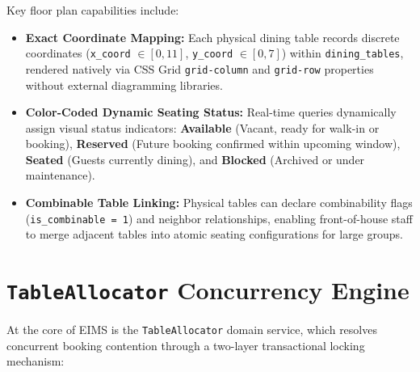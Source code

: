 Key floor plan capabilities include:
\begin{itemize}
    \item \textbf{Exact Coordinate Mapping:} Each physical dining table records discrete coordinates (\texttt{x\_coord} $\in [0, 11]$, \texttt{y\_coord} $\in [0, 7]$) within \texttt{dining\_tables}, rendered natively via CSS Grid \texttt{grid-column} and \texttt{grid-row} properties without external diagramming libraries.
    \item \textbf{Color-Coded Dynamic Seating Status:} Real-time queries dynamically assign visual status indicators: \textbf{Available} (Vacant, ready for walk-in or booking), \textbf{Reserved} (Future booking confirmed within upcoming window), \textbf{Seated} (Guests currently dining), and \textbf{Blocked} (Archived or under maintenance).
    \item \textbf{Combinable Table Linking:} Physical tables can declare combinability flags (\texttt{is\_combinable = 1}) and neighbor relationships, enabling front-of-house staff to merge adjacent tables into atomic seating configurations for large groups.
\end{itemize}

\section{\texorpdfstring{\texttt{TableAllocator}}{TableAllocator} Concurrency Engine}
\label{sec:feat_table_allocator}
At the core of EIMS is the \texttt{TableAllocator} domain service, which resolves concurrent booking contention through a two-layer transactional locking mechanism:

